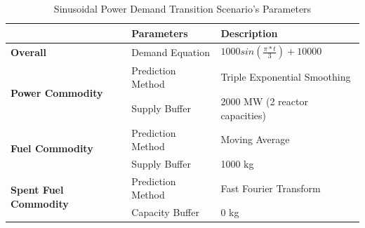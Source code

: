 \documentclass{anstrans}
\begin{document}
\begin{table}[!htbp]
    \centering
    \caption {Sinusoidal Power Demand Transition Scenario's Parameters}
	\label{tab:transition-scenario-sine-power}
    \begin{tabular}{|l|l|p{4.5cm}|}
    \hline
                                     & \textbf{Parameters}    & \textbf{Description} \\ \hline
    \textbf{Overall}& Demand Equation & $1000sin(\frac{\pi*t}{3})+10000$ \\ \hline
    \multirow{2}{*}{\textbf{Power Commodity}} & Prediction Method      &  Triple Exponential Smoothing \\ \cline{2-3} 
                                     & Supply Buffer          &  2000 MW (2 reactor capacities)\\ \hline
    \multirow{2}{*}{\textbf{Fuel Commodity}}  & Prediction Method      &  Moving Average\\ \cline{2-3}
                                     & Supply Buffer & 1000 kg \\ \hline
    \multirow{2}{*}{\textbf{Spent Fuel Commodity}}  & Prediction Method      & Fast Fourier Transform\\ \cline{2-3}
                                     & Capacity Buffer & 0 kg \\ \hline
    \end{tabular}
\end{table}
\end{document}
